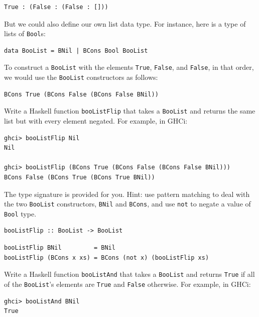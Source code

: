 \documentclass[addpoints]{exam}
\begin{document}
\begin{questions}
\begin{verbatim}
True : (False : (False : []))
\end{verbatim}

But we could also define our own list data type.  For instance, here is a type of lists of \verb|Bool|s:

\begin{verbatim}
data BooList = BNil | BCons Bool BooList
\end{verbatim}

To construct a \verb|BooList| with the elements \verb|True|, \verb|False|, and \verb|False|, in that order, we would use the \verb|BooList| constructors as follows:

\begin{verbatim}
BCons True (BCons False (BCons False BNil))
\end{verbatim}

\question[7] Write a Haskell function \verb|booListFlip| that takes a \verb|BooList| and returns the same list but with every element negated.  For example, in GHCi:

\begin{verbatim}
ghci> booListFlip Nil
Nil

ghci> booListFlip (BCons True (BCons False (BCons False BNil)))
BCons False (BCons True (BCons True BNil))
\end{verbatim}

The type signature is provided for you.  Hint: use pattern matching to deal with the two \verb|BooList| constructors, \verb|BNil| and \verb|BCons|, and use \verb|not| to negate a value of \verb|Bool| type.

\begin{verbatim}
booListFlip :: BooList -> BooList
\end{verbatim}
\begin{solutionorbox}[3in]
\begin{verbatim}
booListFlip BNil         = BNil
booListFlip (BCons x xs) = BCons (not x) (booListFlip xs)
\end{verbatim}
\end{solutionorbox}

\newpage

\question[7] Write a Haskell function \verb|booListAnd| that takes a \verb|BooList| and returns \verb|True| if all of the \verb|BooList|'s elements are \verb|True| and \verb|False| otherwise.  For example, in GHCi:

\begin{verbatim}
ghci> booListAnd BNil
True


\end{verbatim}
\end{questions}
\end{document}
